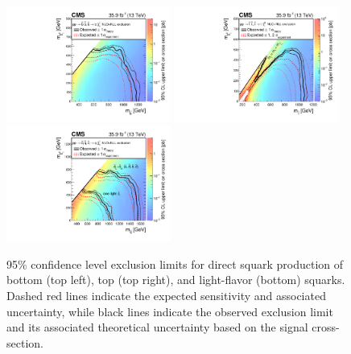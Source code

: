 \begin{figure}
	\centering
	\includegraphics[width=0.48\textwidth]{results/figs/interpretations/T2bb_35p9ifb_Moriond2017_Mar07_XSEC}
	\includegraphics[width=0.48\textwidth]{results/figs/interpretations/T2tt_35p9ifb_Moriond2017_Mar07_XSEC}
	\includegraphics[width=0.48\textwidth]{results/figs/interpretations/T2qq_35p9ifb_Moriond2017_Mar07_XSEC}
	\renewcommand{\baselinestretch}{1.0}
	\caption[95\% confidence level exclusion limits for direct squark production of bottom (top left), top (top right), and light-flavor (bottom) squarks.]{95\% confidence level exclusion limits for direct squark production of bottom (top left), top (top right), and light-flavor (bottom) squarks. Dashed red lines indicate the expected sensitivity and associated uncertainty, while black lines indicate the observed exclusion limit and its associated theoretical uncertainty based on the signal cross-section.}
	\label{fig:limitsSquark}
\end{figure}
